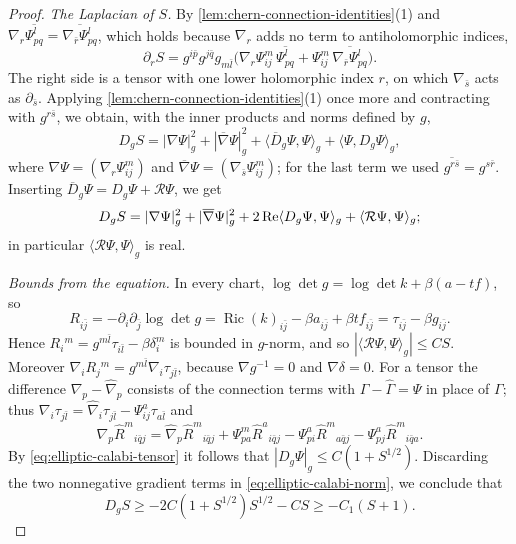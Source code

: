 \begin{proof}
\emph{The Laplacian of $S$.} By \cref{lem:chern-connection-identities}(1) and $\nabla_r\overline{\Psi^l_{pq}}=\overline{\nabla_{\bar r}\Psi^l_{pq}}$, which holds because $\nabla_r$ adds no term to antiholomorphic indices,
\[
 \partial_rS=g^{i\bar p}g^{j\bar q}g_{m\bar l}\bigl(\nabla_r\Psi^m_{ij}\,\overline{\Psi^l_{pq}}+\Psi^m_{ij}\,\overline{\nabla_{\bar r}\Psi^l_{pq}}\bigr).
\]
The right side is a tensor with one lower holomorphic index $r$, on which $\nabla_{\bar s}$ acts as $\partial_{\bar s}$. Applying \cref{lem:chern-connection-identities}(1) once more and contracting with $g^{r\bar s}$, we obtain, with the inner products and norms defined by $g$,
\[
 D_gS=|\nabla\Psi|_g^2+|\overline\nabla\Psi|_g^2+\langle\overline D_g\Psi,\Psi\rangle_g+\langle\Psi,D_g\Psi\rangle_g,
\]
where $\nabla\Psi=(\nabla_r\Psi^m_{ij})$ and $\overline\nabla\Psi=(\nabla_{\bar s}\Psi^m_{ij})$; for the last term we used $\overline{g^{r\bar s}}=g^{s\bar r}$. Inserting $\overline D_g\Psi=D_g\Psi+\mathcal R\Psi$, we get
\begin{equation}\label{eq:elliptic-calabi-norm}
 D_gS=|\nabla\Psi|_g^2+|\overline\nabla\Psi|_g^2
       +2\operatorname{Re}\langle D_g\Psi,\Psi\rangle_g
       +\langle\mathcal R\Psi,\Psi\rangle_g;
\end{equation}
in particular $\langle\mathcal R\Psi,\Psi\rangle_g$ is real.

\emph{Bounds from the equation.} In every chart, $\log\det g=\log\det k+\beta(a-tf)$, so
\[
 R_{i\bar j}=-\partial_i\partial_{\bar j}\log\det g=\operatorname{Ric}(k)_{i\bar j}-\beta a_{i\bar j}+\beta tf_{i\bar j}=\tau_{i\bar j}-\beta g_{i\bar j}.
\]
Hence $R_i{}^m=g^{m\bar l}\tau_{i\bar l}-\beta\delta^m_i$ is bounded in $g$-norm, and so $|\langle\mathcal R\Psi,\Psi\rangle_g|\leq CS$. Moreover $\nabla_iR_j{}^m=g^{m\bar l}\nabla_i\tau_{j\bar l}$, because $\nabla g^{-1}=0$ and $\nabla\delta=0$. For a tensor the difference $\nabla_p-\widehat\nabla_p$ consists of the connection terms with $\Gamma-\widehat\Gamma=\Psi$ in place of $\Gamma$; thus $\nabla_i\tau_{j\bar l}=\widehat\nabla_i\tau_{j\bar l}-\Psi^a_{ij}\tau_{a\bar l}$ and
\[
 \nabla_p\widehat R^m{}_{i\bar qj}=\widehat\nabla_p\widehat R^m{}_{i\bar qj}+\Psi^m_{pa}\widehat R^a{}_{i\bar qj}-\Psi^a_{pi}\widehat R^m{}_{a\bar qj}-\Psi^a_{pj}\widehat R^m{}_{i\bar qa}.
\]
By \eqref{eq:elliptic-calabi-tensor} it follows that $|D_g\Psi|_g\leq C(1+S^{1/2})$. Discarding the two nonnegative gradient terms in \eqref{eq:elliptic-calabi-norm}, we conclude that
\[
 D_gS\geq-2C(1+S^{1/2})S^{1/2}-CS\geq-C_1(S+1).
\]


\end{proof}
